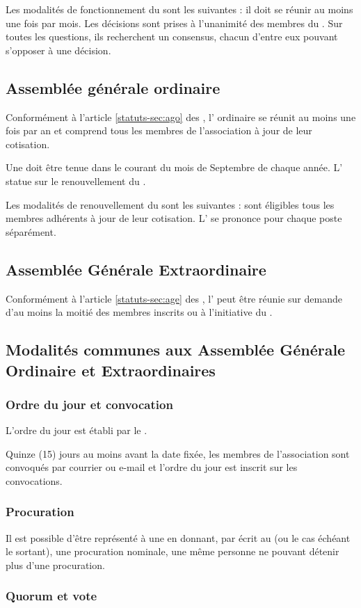 \documentclass[a4paper,french,10pt]{article}
\newcommand{\article}[1]{\subsection{#1}\addtocounter{article}{1}}
\newcounter{article}
\newcommand{\artrefst}[1]{article \ref{statuts-#1} des \statuts{}}
\begin{document}
Les modalités de fonctionnement du \bureau{} sont les suivantes : il
doit se réunir au moins une fois par mois. Les décisions sont
prises à l'unanimité des membres du \bureau{}. Sur toutes les questions,
ils recherchent un consensus, chacun d’entre eux pouvant s’opposer à
une décision.

\article{Assemblée générale ordinaire}
\label{sec:assembl-gener-ordin}
Conformément à l'\artrefst{sec:ago}, l’\AG{} ordinaire se réunit au moins une fois par an et comprend tous les membres de l’association à jour de leur cotisation.

Une \AG{} doit être tenue dans le courant du mois de Septembre de chaque année. L'\AG{} statue sur le renouvellement du \bureau{}.

Les modalités de renouvellement du \bureau{} sont les suivantes : sont éligibles tous les membres adhérents à jour de leur cotisation. L'\AG{} se prononce pour chaque poste séparément.

\article{Assemblée Générale Extraordinaire}
\label{sec:age}
Conformément à l'\artrefst{sec:age}, l'\AGE{} peut être réunie sur demande d'au moins la moitié des membres inscrits ou à l'initiative du \bureau{}.

\article{Modalités communes aux Assemblée Générale Ordinaire et Extraordinaires}
\label{sec:ag}

\subsubsection*{Ordre du jour et convocation}

L'ordre du jour est établi par le \bureau{}.

Quinze (15) jours au moins avant la date fixée, les membres de
l’association sont convoqués par courrier ou e-mail et l’ordre du jour est inscrit
sur les convocations.


\subsubsection*{Procuration}

Il est possible d’être représenté à une \AG{} en donnant,
par écrit au \bureau{} (ou le cas échéant le \bureau{} sortant), une procuration nominale, une même personne ne pouvant détenir plus
d’une procuration.

\subsubsection*{Quorum et vote}
\end{document}
